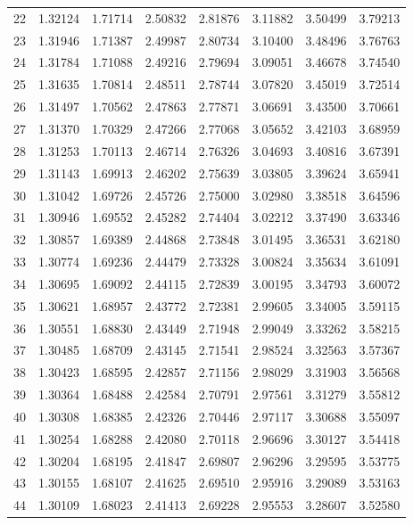 \begin{tabular}{lrrrrrrr}
22 & 1.32124 & 1.71714 & 2.50832 & 2.81876 & 3.11882 & 3.50499 & 3.79213 \\
23 & 1.31946 & 1.71387 & 2.49987 & 2.80734 & 3.10400 & 3.48496 & 3.76763 \\
24 & 1.31784 & 1.71088 & 2.49216 & 2.79694 & 3.09051 & 3.46678 & 3.74540 \\
25 & 1.31635 & 1.70814 & 2.48511 & 2.78744 & 3.07820 & 3.45019 & 3.72514 \\
26 & 1.31497 & 1.70562 & 2.47863 & 2.77871 & 3.06691 & 3.43500 & 3.70661 \\
27 & 1.31370 & 1.70329 & 2.47266 & 2.77068 & 3.05652 & 3.42103 & 3.68959 \\
28 & 1.31253 & 1.70113 & 2.46714 & 2.76326 & 3.04693 & 3.40816 & 3.67391 \\
29 & 1.31143 & 1.69913 & 2.46202 & 2.75639 & 3.03805 & 3.39624 & 3.65941 \\
30 & 1.31042 & 1.69726 & 2.45726 & 2.75000 & 3.02980 & 3.38518 & 3.64596 \\
31 & 1.30946 & 1.69552 & 2.45282 & 2.74404 & 3.02212 & 3.37490 & 3.63346 \\
32 & 1.30857 & 1.69389 & 2.44868 & 2.73848 & 3.01495 & 3.36531 & 3.62180 \\
33 & 1.30774 & 1.69236 & 2.44479 & 2.73328 & 3.00824 & 3.35634 & 3.61091 \\
34 & 1.30695 & 1.69092 & 2.44115 & 2.72839 & 3.00195 & 3.34793 & 3.60072 \\
35 & 1.30621 & 1.68957 & 2.43772 & 2.72381 & 2.99605 & 3.34005 & 3.59115 \\
36 & 1.30551 & 1.68830 & 2.43449 & 2.71948 & 2.99049 & 3.33262 & 3.58215 \\
37 & 1.30485 & 1.68709 & 2.43145 & 2.71541 & 2.98524 & 3.32563 & 3.57367 \\
38 & 1.30423 & 1.68595 & 2.42857 & 2.71156 & 2.98029 & 3.31903 & 3.56568 \\
39 & 1.30364 & 1.68488 & 2.42584 & 2.70791 & 2.97561 & 3.31279 & 3.55812 \\
40 & 1.30308 & 1.68385 & 2.42326 & 2.70446 & 2.97117 & 3.30688 & 3.55097 \\
41 & 1.30254 & 1.68288 & 2.42080 & 2.70118 & 2.96696 & 3.30127 & 3.54418 \\
42 & 1.30204 & 1.68195 & 2.41847 & 2.69807 & 2.96296 & 3.29595 & 3.53775 \\
43 & 1.30155 & 1.68107 & 2.41625 & 2.69510 & 2.95916 & 3.29089 & 3.53163 \\
44 & 1.30109 & 1.68023 & 2.41413 & 2.69228 & 2.95553 & 3.28607 & 3.52580 \\

\end{tabular}
